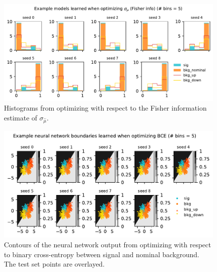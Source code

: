 \documentclass[
  11pt,
  numbers=noendperiod]{book}
\begin{document}
\begin{figure}

{\centering \includegraphics{./images/new-hist-models-poi_uncert-5nobin.pdf}

}

\caption{\label{fig-hists-5bin-poi-uncert}Histograms from optimizing
with respect to the Fisher information estimate of
\(\sigma_{\hat{\mu}}\).}

\end{figure}

\begin{figure}

{\centering \includegraphics{./images/new-grid-models-bce-5nobin (1).pdf}

}

\caption{\label{fig-grid-5bin-bce}Contours of the neural network output
from optimizing with respect to binary cross-entropy between signal and
nominal background. The test set points are overlayed.}

\end{figure}
\end{document}
